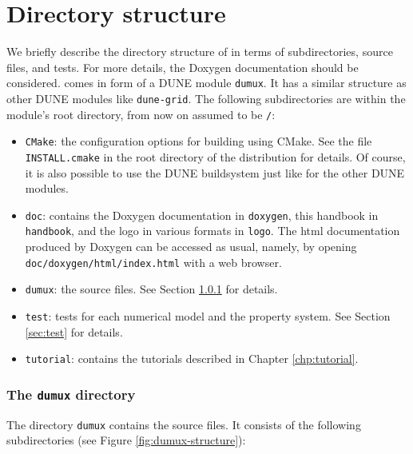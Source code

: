 \chapter{Directory structure}

We briefly describe the directory structure of \eWoms in terms 
of subdirectories, source files, and tests. For more details, 
the Doxygen documentation should be considered. 
\eWoms comes in form of a DUNE module \texttt{dumux}. 
It has a similar structure as other DUNE modules like \texttt{dune-grid}. 
The following subdirectories are within the module's root directory, 
from now on assumed to be \texttt{/}: 
\begin{itemize} 
\item \texttt{CMake}: the configuration options 
for building \eWoms using CMake. See the file \texttt{INSTALL.cmake} in 
the root directory of the \eWoms distribution for details. Of course, 
it is also possible to use the DUNE buildsystem just like for the other 
DUNE modules.
\item \texttt{doc}: contains the Doxygen documentation in \texttt{doxygen}, 
this handbook in \texttt{handbook}, and the \eWoms logo in various formats in 
\texttt{logo}. The html documentation produced by Doxygen can be accessed as usual, 
namely, by opening \texttt{doc/doxygen/html/index.html} with a web browser. 
\item \texttt{dumux}: the \eWoms source files. See Section \ref{sec:dumux} for details. 
\item \texttt{test}: tests for each numerical model and the property system. 
See Section \ref{sec:test} for details. 
\item \texttt{tutorial}: contains the tutorials described in Chapter \ref{chp:tutorial}. 
\end{itemize}


\subsection{The \texttt{dumux} directory}\label{sec:dumux}

The directory \texttt{dumux} contains the \eWoms source files. It consists of the following subdirectories (see Figure \ref{fig:dumux-structure}): 

